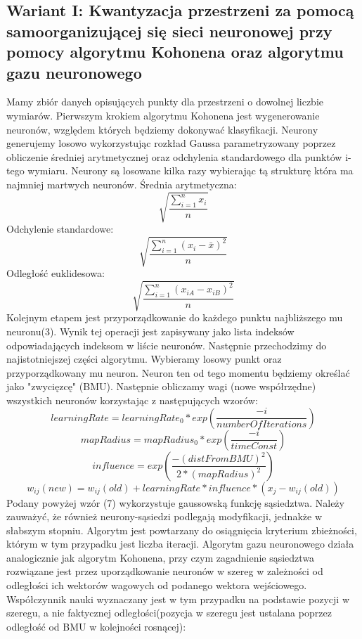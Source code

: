 \documentclass{classrep}
\begin{document}
{{\subsection*{Wariant I: Kwantyzacja przestrzeni za pomocą samoorganizującej się sieci neuronowej przy pomocy algorytmu Kohonena oraz algorytmu gazu neuronowego}
Mamy zbiór danych opisujących punkty dla przestrzeni o dowolnej liczbie wymiarów. Pierwszym krokiem algorytmu Kohonena jest wygenerowanie neuronów, względem których będziemy dokonywać klasyfikacji. Neurony generujemy losowo wykorzystując rozkład Gaussa parametryzowany poprzez obliczenie średniej arytmetycznej oraz odchylenia standardowego dla punktów i-tego wymiaru. Neurony są losowane kilka razy wybierając tą strukturę która ma najmniej martwych neuronów. Średnia arytmetyczna: 
\begin{equation}
\sqrt{\dfrac{\sum_{i=1}^{n} x_i}{n} }
\end{equation}
Odchylenie standardowe:
\begin{equation}
\sqrt{\dfrac{\sum_{i=1}^{n} {(x_i - \bar{x})^2}}{n} }
\end{equation}
Odległość euklidesowa:
\begin{equation}
\sqrt{\dfrac{\sum_{i=1}^{n} {(x_{iA} - x_{iB})^2}}{n} }
\end{equation}
Kolejnym etapem jest przyporządkowanie do każdego punktu najbliższego mu neuronu(3). Wynik tej operacji jest zapisywany jako lista indeksów odpowiadających indeksom w liście neuronów. Następnie przechodzimy do najistotniejszej części algorytmu. Wybieramy losowy punkt oraz przyporządkowany mu neuron. Neuron ten od tego momentu będziemy określać jako "zwycięzcę" (BMU). Następnie obliczamy wagi (nowe współrzędne) wszystkich neuronów korzystając z następujących wzorów: 
\begin{equation}
learningRate=learningRate_0 * exp(\dfrac{-i}{numberOfIterations})
\end{equation}
\begin{equation}
mapRadius=mapRadius_0 * exp(\dfrac{-i}{timeConst})
\end{equation}
\begin{equation}
influence=exp(\dfrac{-(distFromBMU)^2}{2*(mapRadius)^2})
\end{equation}
\begin{equation}
w_{ij}(new)=w_{ij}(old)+learningRate  * influence *  (x_j - w_{ij}(old) )
\end{equation}
Podany powyżej wzór (7) wykorzystuje gaussowską funkcję sąsiedztwa.
Należy zauważyć, że również neurony-sąsiedzi podlegają modyfikacji, jednakże w słabszym stopniu. Algorytm jest powtarzany do osiągnięcia kryterium zbieżności, którym w tym przypadku jest liczba iteracji. Algorytm gazu neuronowego działa analogicznie jak algorytm Kohonena, przy czym zagadnienie sąsiedztwa rozwiązane jest przez uporządkowanie neuronów w szereg w zależności od odległości ich wektorów wagowych od podanego wektora wejściowego. Współczynnik nauki wyznaczany jest w tym przypadku na podstawie pozycji w szeregu, a nie faktycznej odległości(pozycja w szeregu jest ustalana poprzez odległość od BMU w kolejności rosnącej):
}}
\end{document}
